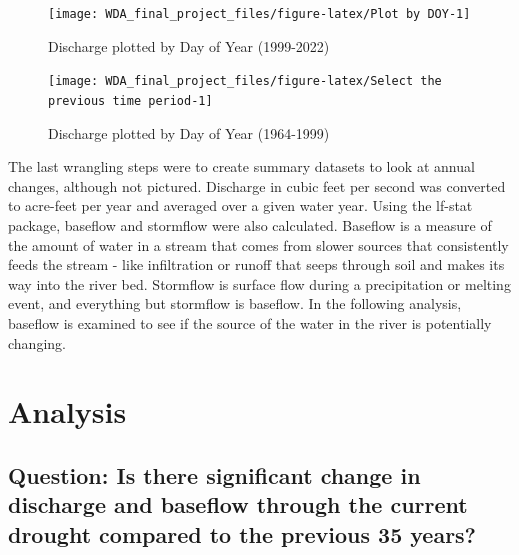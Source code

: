 \documentclass[
  12pt,
]{article}
\begin{document}
\begin{figure}

\texttt{[image: WDA\_final\_project\_files/figure-latex/Plot by DOY-1]} \hfill{}

\caption{Discharge plotted by Day of Year (1999-2022)}\label{fig:Plot by DOY}
\end{figure}

\begin{figure}

\texttt{[image: WDA\_final\_project\_files/figure-latex/Select the previous time period-1]} \hfill{}

\caption{Discharge plotted by Day of Year (1964-1999)}\label{fig:Select the previous time period}
\end{figure}
\newpage

The last wrangling steps were to create summary datasets to look at
annual changes, although not pictured. Discharge in cubic feet per
second was converted to acre-feet per year and averaged over a given
water year. Using the lf-stat package, baseflow and stormflow were also
calculated. Baseflow is a measure of the amount of water in a stream
that comes from slower sources that consistently feeds the stream - like
infiltration or runoff that seeps through soil and makes its way into
the river bed. Stormflow is surface flow during a precipitation or
melting event, and everything but stormflow is baseflow. In the
following analysis, baseflow is examined to see if the source of the
water in the river is potentially changing.

\newpage

\hypertarget{analysis}{%
\section{Analysis}\label{analysis}}

\hypertarget{question-is-there-significant-change-in-discharge-and-baseflow-through-the-current-drought-compared-to-the-previous-35-years}{%
\subsection{Question: Is there significant change in discharge and
baseflow through the current drought compared to the previous 35
years?}\label{question-is-there-significant-change-in-discharge-and-baseflow-through-the-current-drought-compared-to-the-previous-35-years}}
\end{document}
